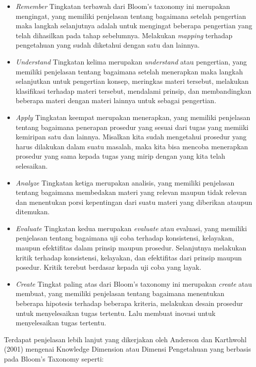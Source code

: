 	\begin{itemize}
		\item \textit{Remember}
			\subitem Tingkatan terbawah dari Bloom's taxonomy ini merupakan mengingat, yang memiliki penjelasan tentang bagaimana setelah pengertian maka langkah selanjutnya adalah untuk mengingat beberapa pengertian yang telah dihasilkan pada tahap sebelumnya. Melakukan \textit{mapping} terhadap pengetahuan yang sudah diketahui dengan satu dan lainnya.
		\item \textit{Understand}
			\subitem Tingkatan kelima merupakan \textit{understand} atau pengertian, yang memiliki penjelasan tentang bagaimana setelah menerapkan maka langkah selanjutkan untuk pengertian konsep, meringkas materi tersebut, melakukan klasifikasi terhadap materi tersebut, mendalami prinsip, dan membandingkan beberapa materi dengan materi lainnya untuk sebagai pengertian.
		\item \textit{Apply}
			\subitem Tingkatan keempat merupakan menerapkan, yang memiliki penjelasan tentang bagaimana penerapan prosedur yang sesuai dari tugas yang memiiki kemiripan satu dan lainnya. Misalkan kita sudah mengetahui prosedur yang harus dilakukan dalam suatu masalah, maka kita bisa mencoba menerapkan prosedur yang sama kepada tugas yang mirip dengan yang kita telah selesaikan.
		\item \textit{Analyze}
			\subitem Tingkatan ketiga merupakan analisis, yang memiliki penjelasan tentang bagaimana membedakan materi yang relevan maupun tidak relevan dan menentukan porsi kepentingan dari suatu materi yang diberikan ataupun ditemukan.
		\item \textit{Evaluate}
			\subitem Tingkatan kedua merupakan \textit{evaluate} atau evaluasi, yang memiliki penjelasan tentang bagaimana uji coba terhadap konsistensi, kelayakan, maupun efektifitas dalam prinsip maupun prosedur. Selanjutnya melakukan kritik terhadap konsistensi, kelayakan, dan efektifitas dari prinsip maupun posedur. Kritik terebut berdasar kepada uji coba yang layak.
		\item \textit{Create}
			\subitem Tingkat paling atas dari Bloom's taxonomy ini merupakan \textit{create} atau membuat, yang memiliki penjelasan tentang bagaimana menentukan beberapa hipotesis terhadap beberapa kriteria, melakukan desain prosedur untuk menyelesaikan tugas tertentu. Lalu membuat inovasi untuk menyelesaikan tugas tertentu.
		
	\end{itemize}
	Terdapat penjelasan lebih lanjut yang dikerjakan oleh Anderson dan Karthwohl (2001) mengenai Knowledge Dimension atau Dimensi Pengetahuan yang berbasis pada Bloom's Taxonomy seperti:
